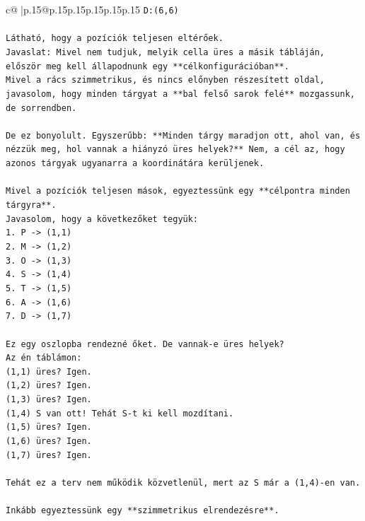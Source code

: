\documentclass{article}
\begin{document}
{\begin{supertabular}{c@{$\;$}|p{.15\linewidth}@{}p{.15\linewidth}p{.15\linewidth}p{.15\linewidth}p{.15\linewidth}p{.15\linewidth}}
{{{\texttt{D:(6,6)} \\
\\ 
\texttt{Látható, hogy a pozíciók teljesen eltérőek.} \\
\texttt{Javaslat: Mivel nem tudjuk, melyik cella üres a másik tábláján, először meg kell állapodnunk egy **célkonfigurációban**.} \\
\texttt{Mivel a rács szimmetrikus, és nincs előnyben részesített oldal, javasolom, hogy minden tárgyat a **bal felső sarok felé** mozgassunk, de sorrendben.} \\
\\ 
\texttt{De ez bonyolult. Egyszerűbb: **Minden tárgy maradjon ott, ahol van, és nézzük meg, hol vannak a hiányzó üres helyek?** Nem, a cél az, hogy azonos tárgyak ugyanarra a koordinátára kerüljenek.} \\
\\ 
\texttt{Mivel a pozíciók teljesen mások, egyeztessünk egy **célpontra minden tárgyra**.} \\
\texttt{Javasolom, hogy a következőket tegyük:} \\
\texttt{1. P {-}> (1,1)} \\
\texttt{2. M {-}> (1,2)} \\
\texttt{3. O {-}> (1,3)} \\
\texttt{4. S {-}> (1,4)} \\
\texttt{5. T {-}> (1,5)} \\
\texttt{6. A {-}> (1,6)} \\
\texttt{7. D {-}> (1,7)} \\
\\ 
\texttt{Ez egy oszlopba rendezné őket. De vannak{-}e üres helyek?} \\
\texttt{Az én táblámon:} \\
\texttt{(1,1) üres? Igen.} \\
\texttt{(1,2) üres? Igen.} \\
\texttt{(1,3) üres? Igen.} \\
\texttt{(1,4) S van ott! Tehát S{-}t ki kell mozdítani.} \\
\texttt{(1,5) üres? Igen.} \\
\texttt{(1,6) üres? Igen.} \\
\texttt{(1,7) üres? Igen.} \\
\\ 
\texttt{Tehát ez a terv nem működik közvetlenül, mert az S már a (1,4){-}en van.} \\
\\ 
\texttt{Inkább egyeztessünk egy **szimmetrikus elrendezésre**.} \\
}}}
\end{supertabular}}
\end{document}
